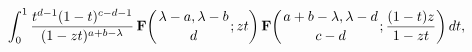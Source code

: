 \[\int_{0}^{1}\frac{t^{d-1}(1-t)^{c-d-1}}{(1-zt)^{a+b-\lambda}}\mathop{\mathbf{F%
}\/}\nolimits\!\left({\lambda-a,\lambda-b\atop d};zt\right)\mathop{\mathbf{F}%
\/}\nolimits\!\left({a+b-\lambda,\lambda-d\atop c-d};\frac{(1-t)z}{1-zt}\right%
)dt,\]